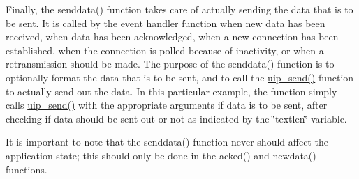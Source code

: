 Finally, the senddata() function takes care of actually sending the data that is to be sent. It is called by the event handler function when new data has been received, when data has been acknowledged, when a new connection has been established, when the connection is polled because of inactivity, or when a retransmission should be made. The purpose of the senddata() function is to optionally format the data that is to be sent, and to call the \hyperlink{a00064_gb59415b2801e568f52bc1d86ef10e159}{uip\_\-send()} function to actually send out the data. In this particular example, the function simply calls \hyperlink{a00064_gb59415b2801e568f52bc1d86ef10e159}{uip\_\-send()} with the appropriate arguments if data is to be sent, after checking if data should be sent out or not as indicated by the \char`\"{}textlen\char`\"{} variable.

It is important to note that the senddata() function never should affect the application state; this should only be done in the acked() and newdata() functions. 